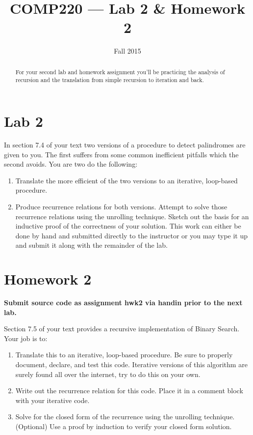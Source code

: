 \documentclass[10pt]{article}
\title{COMP220 --- Lab 2 \& Homework 2}
\author{ }
\date{Fall 2015}
\begin{document}
\maketitle

\begin{abstract}
  For your second lab and homework assignment you'll be practicing the analysis of recursion and the translation from simple recursion to iteration and back.
\end{abstract}

\section{Lab 2}

In section 7.4 of your text two versions of a procedure to detect palindromes are given to you. The first suffers from some common inefficient pitfalls which the second avoids.  You are two do the following:
\begin{enumerate}
  \item Translate the more efficient of the two versions to an iterative, loop-based procedure.
  \item Produce recurrence relations for both versions. Attempt to solve those recurrence relations using the unrolling technique. Sketch out the basis for an inductive proof of the correctness of your solution. This work can either be done by hand and submitted directly to the instructor or you may type it up and submit it along with the remainder of the lab.

\end{enumerate}

\section{Homework 2}

\begin{center}
  \textbf{Submit source code as assignment hwk2 via handin prior to the next lab.}
\end{center}

Section 7.5 of your text provides a recursive implementation of Binary Search. Your job is to:
\begin{enumerate}
  \item Translate this to an iterative, loop-based procedure. Be sure to properly document, declare, and test this code. Iterative versions of this algorithm are surely found all over the internet, try to do this on your own.
  \item Write out the recurrence relation for this code. Place it in a comment block with your iterative code.
  \item Solve for the closed form of the recurrence using the unrolling technique. (Optional) Use a proof by induction to verify your closed form solution.
\end{enumerate}
\end{document}

